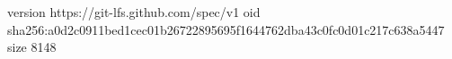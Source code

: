 version https://git-lfs.github.com/spec/v1
oid sha256:a0d2c0911bed1cec01b26722895695f1644762dba43c0fc0d01c217c638a5447
size 8148
